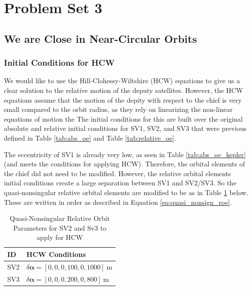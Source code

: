 \section{Problem Set 3}
\subsection{We are Close in Near-Circular Orbits}

\subsubsection{Initial Conditions for HCW}

We would like to use the Hill-Clohessy-Wiltshire (HCW) equations to give us a clear solution to the relative motion of the deputy satellites. However, the HCW equations assume that the motion of the depity with respect to the chief is very small compared to the orbit radius, as they rely on linearizing the non-linear equations of motion the The initial conditions for this are built over the original absolute and relative initial conditions for SV1, SV2, and SV3 that were previous defined in Table \ref{tab:abs_oe} and Table \ref{tab:relative_oe}.

The eccentricity of SV1 is already very low, as seen in Table \ref{tab:abs_oe_kepler} (and meets the conditions for applying HCW). Therefore, the orbital elements of the chief did not need to be modified. However, the relative orbital elements initial conditions create a large separation between SV1 and SV2/SV3. So the quasi-nonsingular relative orbital elements are modified to be as in Table \ref{tab:relative_oe_hcw} below. These are written in order as described in Equation \ref{eq:quasi_nonsign_roe}.

\begin{table}[h!]
\centering
\begin{tabular}{ll}
\toprule
\textbf{ID} & \textbf{HCW Conditions} \\
\midrule
SV2 & $\delta\boldsymbol{\alpha} = [0, 0, 0, 100, 0, 1000]~\text{m}$ \\
SV3 & $\delta\boldsymbol{\alpha} = [0, 0, 0, 200, 0, 800]~\text{m}$ \\
\bottomrule
\end{tabular}
\caption{Quasi-Nonsingular Relative Orbit Parameters for SV2 and Sv3 to apply for HCW}
\label{tab:relative_oe_hcw}
\end{table}

